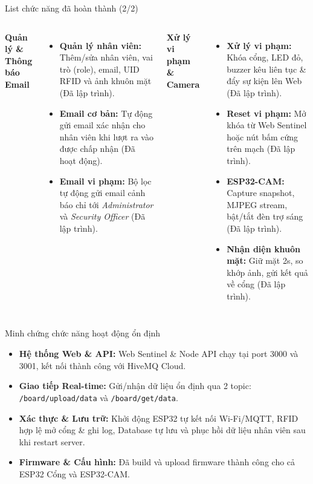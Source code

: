 \documentclass[aspectratio=169]{beamer}
\begin{document}
\begin{frame}{List chức năng đã hoàn thành (2/2)}
  \begin{columns}[T]
      \textbf{Quản lý \& Thông báo Email}
      \begin{itemize}
        \item \textbf{Quản lý nhân viên:} Thêm/sửa nhân viên, vai trò (role), email, UID RFID và ảnh khuôn mặt (Đã lập trình).
        \item \textbf{Email cơ bản:} Tự động gửi email xác nhận cho nhân viên khi lượt ra vào được chấp nhận (Đã hoạt động).
        \item \textbf{Email vi phạm:} Bộ lọc tự động gửi email cảnh báo chỉ tới \textit{Administrator} và \textit{Security Officer} (Đã lập trình).
      \end{itemize}

      \textbf{Xử lý vi phạm \& Camera}
      \begin{itemize}
        \item \textbf{Xử lý vi phạm:} Khóa cổng, LED đỏ, buzzer kêu liên tục \& đẩy sự kiện lên Web (Đã lập trình).
        \item \textbf{Reset vi phạm:} Mở khóa từ Web Sentinel hoặc nút bấm cứng trên mạch (Đã lập trình).
        \item \textbf{ESP32-CAM:} Capture snapshot, MJPEG stream, bật/tắt đèn trợ sáng (Đã lập trình).
        \item \textbf{Nhận diện khuôn mặt:} Giữ mặt 2s, so khớp ảnh, gửi kết quả về cổng (Đã lập trình).
      \end{itemize}
  \end{columns}
\end{frame}

\begin{frame}{Minh chứng chức năng hoạt động ổn định}
  \begin{itemize}
    \item \textbf{Hệ thống Web \& API:} Web Sentinel \& Node API chạy tại port 3000 và 3001, kết nối thành công với HiveMQ Cloud.
    \item \textbf{Giao tiếp Real-time:} Gửi/nhận dữ liệu ổn định qua 2 topic: \texttt{/board/upload/data} và \texttt{/board/get/data}.
    \item \textbf{Xác thực \& Lưu trữ:} Khởi động ESP32 tự kết nối Wi-Fi/MQTT, RFID hợp lệ mở cổng \& ghi log, Database tự lưu và phục hồi dữ liệu nhân viên sau khi restart server.
    \item \textbf{Firmware \& Cấu hình:} Đã build và upload firmware thành công cho cả ESP32 Cổng và ESP32-CAM.
  \end{itemize}
\end{frame} 
\end{document}
